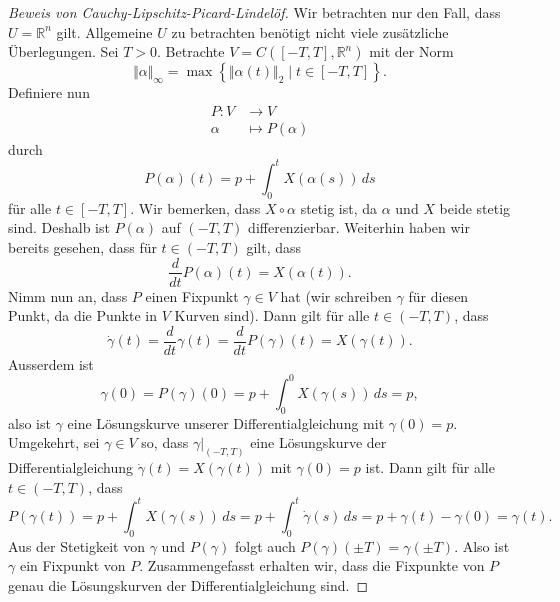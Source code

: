 \documentclass[../main.tex]{subfiles}
\begin{document}
\begin{proof}[Beweis von Cauchy-Lipschitz-Picard-Lindelöf]
  Wir betrachten nur den Fall, dass $U = \mathbb{R}^n$ gilt.
  Allgemeine $U$ zu betrachten benötigt nicht viele zusätzliche
  Überlegungen.
  Sei $T > 0$.
  Betrachte $V = C([-T, T], \mathbb{R}^n)$
  mit der Norm
  \[
    \Vert \alpha \Vert_{\infty} = \max \left\{\Vert \alpha(t) \Vert_2
    \mid t \in [-T, T]\right\}.
  \]
  Definiere nun
  \begin{align*}
    P \colon V & \to V \\
    \alpha & \mapsto P(\alpha)
  \end{align*}
  durch
  \[
    P(\alpha)(t) = p + \int_{0}^{t} X(\alpha(s)) \, ds
  \]
  für alle $t \in [-T, T]$.
  Wir bemerken, dass $X \circ \alpha$ stetig ist,
  da $\alpha$ und $X$ beide stetig sind. Deshalb
  ist $P(\alpha)$ auf $(-T, T)$ differenzierbar.
  Weiterhin haben wir bereits gesehen,
  dass für $t \in (-T, T)$ gilt, dass
  \[
    \frac{d}{dt} P(\alpha)(t) = X(\alpha(t)).
  \]
  Nimm nun an, dass $P$ einen Fixpunkt $\gamma \in V$ 
  hat
  (wir schreiben $\gamma$ für diesen Punkt,
  da die Punkte in $V$ Kurven sind). 
  Dann gilt für alle $t \in (-T, T)$, dass
  \[
    \dot \gamma(t) = \frac{d}{dt}\gamma(t) =
    \frac{d}{dt} P(\gamma)(t)
    = X(\gamma(t)).
  \]
  Ausserdem ist
  \[
    \gamma(0) = P(\gamma)(0) = p + \int_{0}^{0} X(\gamma(s)) \, ds
    = p,
  \]
  also ist $\gamma$ eine Lösungskurve unserer
  Differentialgleichung mit $\gamma(0) = p$.
  Umgekehrt, sei $\gamma \in V$ so, dass
  $\gamma|_{(-T, T)}$ eine Lösungskurve der Differentialgleichung
  $\dot \gamma(t) = X(\gamma(t))$ mit $\gamma(0) = p$ ist.
  Dann gilt für alle $t \in (-T, T)$,
  dass
  \[
    P(\gamma(t)) = p + \int_{0}^{t} X(\gamma(s)) \, ds
    = p + \int_{0}^{t} \dot \gamma(s) \, ds
    = p + \gamma(t) - \gamma(0)
    = \gamma(t).
  \]
  Aus der Stetigkeit von $\gamma$ und $P(\gamma)$ 
  folgt auch $P(\gamma)(\pm T) = \gamma(\pm T)$.
  Also ist $\gamma$ ein Fixpunkt von $P$.
  Zusammengefasst erhalten wir, dass
  die Fixpunkte von $P$ genau die Lösungskurven
  der Differentialgleichung sind.


\end{proof}
\end{document}
